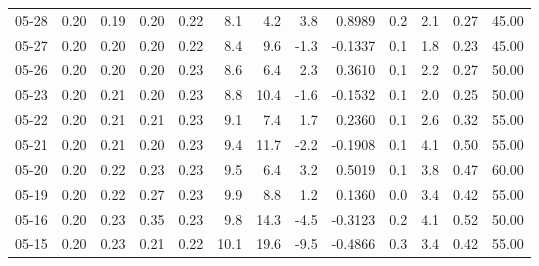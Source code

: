 \begin{threeparttable}
{\begin{tabular}{lrrrrrrrrrrrr}
  05-28 &          0.20 &          0.19 &          0.20 &        0.22 &                 8.1 &                 4.2 &        3.8 &       0.8989 &                 0.2 &              2.1 &            0.27 &                  45.00 \\
  05-27 &          0.20 &          0.20 &          0.20 &        0.22 &                 8.4 &                 9.6 &       -1.3 &      -0.1337 &                 0.1 &              1.8 &            0.23 &                  45.00 \\
  05-26 &          0.20 &          0.20 &          0.20 &        0.23 &                 8.6 &                 6.4 &        2.3 &       0.3610 &                 0.1 &              2.2 &            0.27 &                  50.00 \\
  05-23 &          0.20 &          0.21 &          0.20 &        0.23 &                 8.8 &                10.4 &       -1.6 &      -0.1532 &                 0.1 &              2.0 &            0.25 &                  50.00 \\
  05-22 &          0.20 &          0.21 &          0.21 &        0.23 &                 9.1 &                 7.4 &        1.7 &       0.2360 &                 0.1 &              2.6 &            0.32 &                  55.00 \\
  05-21 &          0.20 &          0.21 &          0.20 &        0.23 &                 9.4 &                11.7 &       -2.2 &      -0.1908 &                 0.1 &              4.1 &            0.50 &                  55.00 \\
  05-20 &          0.20 &          0.22 &          0.23 &        0.23 &                 9.5 &                 6.4 &        3.2 &       0.5019 &                 0.1 &              3.8 &            0.47 &                  60.00 \\
  05-19 &          0.20 &          0.22 &          0.27 &        0.23 &                 9.9 &                 8.8 &        1.2 &       0.1360 &                 0.0 &              3.4 &            0.42 &                  55.00 \\
  05-16 &          0.20 &          0.23 &          0.35 &        0.23 &                 9.8 &                14.3 &       -4.5 &      -0.3123 &                 0.2 &              4.1 &            0.52 &                  50.00 \\
  05-15 &          0.20 &          0.23 &          0.21 &        0.22 &                10.1 &                19.6 &       -9.5 &      -0.4866 &                 0.3 &              3.4 &            0.42 &                  55.00 \\

\end{tabular}}
\end{threeparttable}
